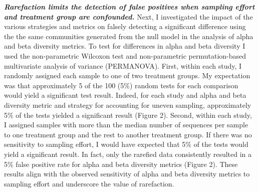 \documentclass[
]{article}
\begin{document}
\textbf{\emph{Rarefaction limits the detection of false positives when
sampling effort and treatment group are confounded.}} Next, I
investigated the impact of the various strategies and metrics on falsely
detecting a significant difference using the the same communities
generated from the null model in the analysis of alpha and beta
diversity metrics. To test for differences in alpha and beta diversity I
used the non-parametric Wilcoxon test and non-parametric
permutation-based multivariate analysis of variance (PERMANOVA). First,
within each study, I randomly assigned each sample to one of two
treatment groups. My expectation was that approximately 5 of the 100
(5\%) random tests for each comparison would yield a significant test
result. Indeed, for each study and alpha and beta diversity metric and
strategy for accounting for uneven sampling, approximately 5\% of the
tests yielded a significant result (Figure 2). Second, within each
study, I assigned samples with more than the median number of sequences
per sample to one treatment group and the rest to another treatment
group. If there was no sensitivity to sampling effort, I would have
expected that 5\% of the tests would yield a significant result. In
fact, only the rarefied data consistently resulted in a 5\% false
positive rate for alpha and beta diversity metrics (Figure 2). These
results align with the observed sensitivity of alpha and beta diversity
metrics to sampling effort and underscore the value of rarefaction.
\end{document}
